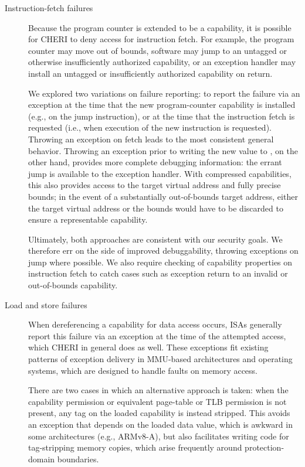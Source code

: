 \begin{description}
\item[Instruction-fetch failures] Because the program counter is extended to
  be a capability, it is possible for CHERI to deny access for instruction
  fetch.
  For example, the program counter may move out of bounds, software may
  jump to an untagged or otherwise insufficiently authorized capability, or an
  exception handler may install an untagged or insufficiently authorized
  capability on return.

  We explored two variations on failure reporting: to report the
  failure via an exception at the time that the new program-counter capability
  is installed (e.g., on the jump instruction), or at the time that the
  instruction fetch is requested (i.e., when execution of the new instruction
  is requested).
  Throwing an exception on fetch leads to the most consistent general
  behavior.
  Throwing an exception prior to writing the new value to \PCC{}, on the other
  hand, provides more complete debugging information: the errant jump \PCC{} is
  available to the exception handler.
  With compressed capabilities, this also provides access to the target virtual
  address and fully precise bounds; in the event of a substantially
  out-of-bounds target address, either the target virtual address or the
  bounds would have to be discarded to ensure a representable capability.

  Ultimately, both approaches are consistent with our security goals.
  We therefore err on the side of improved debuggability, throwing exceptions
  on jump where possible.
  We also require checking of capability properties on instruction fetch to
  catch cases such as exception return to an invalid or out-of-bounds
  capability.

\item[Load and store failures] When dereferencing a capability for data
  access occurs, ISAs generally report this failure via an exception at the
  time of the attempted access, which CHERI in general does as well.
  These exceptions fit existing patterns of exception delivery in MMU-based
  architectures and operating systems, which are designed to handle faults on
  memory access.

  There are two cases in which an alternative approach is taken: when the
  \cappermL capability permission or equivalent page-table or TLB
  permission is not present, any tag on the loaded capability is instead
  stripped.
  This avoids an exception that depends on the loaded data value, which is
  awkward in some architectures (e.g., ARMv8-A), but also facilitates writing
  code for tag-stripping memory copies, which arise frequently around
  protection-domain boundaries.


\end{description}
